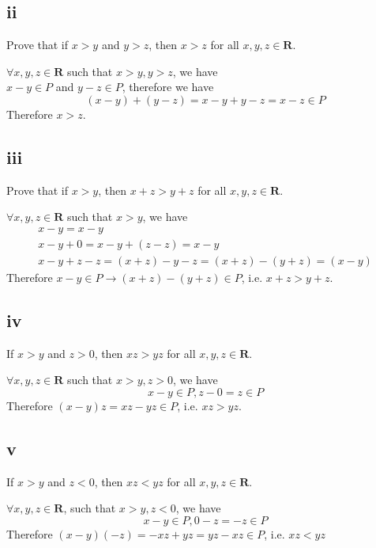 \documentclass{article}
\begin{document}
\subsection*{ii}
Prove that if $x > y$ and $y > z$, then $x > z$ for all $x, y, z \in \mathbf{R}$.
\begin{addmargin}[1em]{0em}
    $\forall x, y, z \in \mathbf{R}$ such that $x > y, y > z$, we have\\
    $x - y \in P$ and $y - z \in P$, therefore we have
    \begin{equation*}
        (x - y) + (y - z) = x - y + y - z = x - z \in P
    \end{equation*}
    Therefore $x > z$.
\end{addmargin}
\subsection*{iii}
Prove that if $x > y$, then $x+z > y + z$ for all $x, y, z \in \mathbf{R}$.
\begin{addmargin}[1em]{0em}
    $\forall x, y, z \in \mathbf{R}$ such that $x > y$, we have
    \begin{equation*}
        \begin{split}
            x - y = x - y\\
            x - y + 0 = x - y + (z - z) = x - y\\
            x - y + z - z = (x + z) - y - z = (x + z) - (y + z) = (x - y)
        \end{split}
    \end{equation*}
    Therefore $x - y \in P \rightarrow (x + z) - (y + z)\in P$, i.e. $x+z > y+z$.
\end{addmargin}
\subsection*{iv}
If $x > y$ and $z > 0$, then $xz > yz$ for all $x, y, z \in \mathbf{R}$.
\begin{addmargin}[1em]{0em}
    $\forall x, y, z \in \mathbf{R}$ such that $x > y, z > 0$, we have
    \begin{equation*}
        x - y \in P, z - 0 = z \in P 
    \end{equation*}
    Therefore $(x - y)z = xz - yz \in P$, i.e. $xz > yz$.
\end{addmargin}
\subsection*{v}
If $x > y$ and $z < 0$, then $xz < yz$ for all $x, y, z \in \mathbf{R}$.
\begin{addmargin}[1em]{0em}
    $\forall x, y, z \in \mathbf{R}$, such that $x > y, z < 0$, we have
    \begin{equation*}
        x - y \in P, 0 - z = -z \in P
    \end{equation*}
    Therefore $(x - y)(-z) = -xz + yz = yz - xz \in P$, i.e. $xz < yz$
\end{addmargin}
\end{document}

